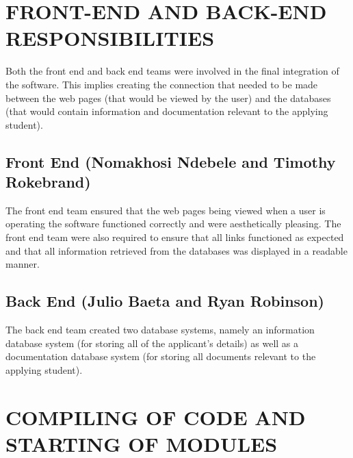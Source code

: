 \documentclass[journal,comsoc]{IEEEtran}
\begin{document}

\section{FRONT-END AND BACK-END RESPONSIBILITIES}

\hfill \break Both the front end and back end teams were involved in the final integration of the software. This implies creating the connection that needed to be made between the web pages (that would be viewed by the user) and the databases (that would contain information and documentation relevant to the applying student). \vspace{2mm}


\subsection{Front End (Nomakhosi Ndebele and Timothy Rokebrand)}

The front end team ensured that the web pages being viewed when a user is operating the software functioned correctly and were aesthetically pleasing. The front end team were also required to ensure that all links functioned as expected and that all information retrieved from the databases was displayed in a readable manner. \vspace{2mm}


\subsection{Back End (Julio Baeta and Ryan Robinson)}

The back end team created two database systems, namely an information database system (for storing all of the applicant's details) as well as a documentation database system (for storing all documents relevant to the applying student). \vspace{2mm}


\section{COMPILING OF CODE AND STARTING OF MODULES}
\end{document}
